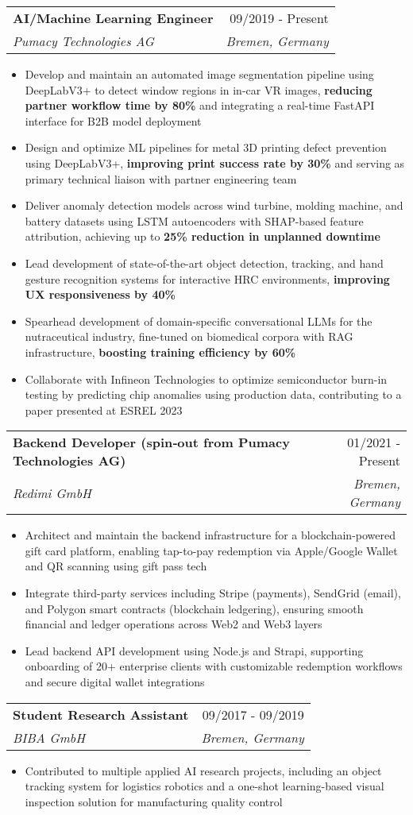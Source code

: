 \documentclass[letterpaper,11pt]{article}
\makeatletter
\newcommand{\resumeItem}[1]{
  \item{#1}
}
\newcommand{\resumeSubheading}[4]{
  \vspace{-2pt}
  \item
    \begin{tabular*}{0.97\textwidth}[t]{l@{\extracolsep{\fill}}r}
      \textbf{#1} & #2 \\
      \textit{#3} & \textit{#4} \\
    \end{tabular*}\vspace{-5pt}
}
\newcommand{\resumeItemListStart}{\begin{itemize}}
\newcommand{\resumeItemListEnd}{\end{itemize}\vspace{-5pt}}
\makeatother
\begin{document}
\resumeSubheading
{AI/Machine Learning Engineer}{09/2019 - Present}
{Pumacy Technologies AG}{Bremen, Germany}
\resumeItemListStart
\resumeItem{Develop and maintain an automated image segmentation pipeline using DeepLabV3+ to detect window regions in in-car VR images, \textbf{reducing partner workflow time by 80\%} and integrating a real-time FastAPI interface for B2B model deployment}
\resumeItem{Design and optimize ML pipelines for metal 3D printing defect prevention using DeepLabV3+, \textbf{improving print success rate by 30\%} and serving as primary technical liaison with partner engineering team}
\resumeItem{Deliver anomaly detection models across wind turbine, molding machine, and battery datasets using LSTM autoencoders with SHAP-based feature attribution, achieving up to \textbf{25\% reduction in unplanned downtime}}
\resumeItem{Lead development of state-of-the-art object detection, tracking, and hand gesture recognition systems for interactive HRC environments, \textbf{improving UX responsiveness by 40\%}}
\resumeItem{Spearhead development of domain-specific conversational LLMs for the nutraceutical industry, fine-tuned on biomedical corpora with RAG infrastructure, \textbf{boosting training efficiency by 60\%}}
\resumeItem{Collaborate with Infineon Technologies to optimize semiconductor burn-in testing by predicting chip anomalies using production data, contributing to a paper presented at ESREL 2023}
\resumeItemListEnd

\resumeSubheading
{Backend Developer (spin‑out from Pumacy Technologies AG)}{01/2021 - Present}
{Redimi GmbH}{Bremen, Germany}
\resumeItemListStart
\resumeItem{Architect and maintain the backend infrastructure for a blockchain-powered gift card platform, enabling tap-to-pay redemption via Apple/Google Wallet and QR scanning using gift pass tech}
\resumeItem{Integrate third-party services including Stripe (payments), SendGrid (email), and Polygon smart contracts (blockchain ledgering), ensuring smooth financial and ledger operations across Web2 and Web3 layers}
\resumeItem{Lead backend API development using Node.js and Strapi, supporting onboarding of 20+ enterprise clients with customizable redemption workflows and secure digital wallet integrations}
\resumeItemListEnd

\resumeSubheading
{Student Research Assistant}{09/2017 - 09/2019}
{BIBA GmbH}{Bremen, Germany}
\resumeItemListStart
\resumeItem{Contributed to multiple applied AI research projects, including an object tracking system for logistics robotics and a one-shot learning-based visual inspection solution for manufacturing quality control}
\resumeItemListEnd
\end{document}
